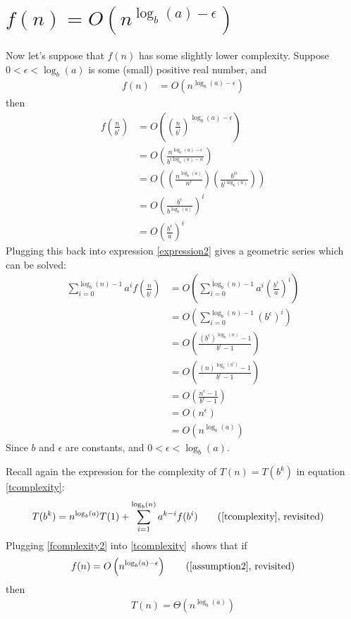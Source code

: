 \documentclass{article}
\begin{document}
\section{$f(n) = O\left(n^{\log_b(a)-\epsilon}\right)$}
\normalsize
Now let's suppose that $f(n)$ has some slightly lower complexity.
Suppose $0< \epsilon < \log_b(a)$ is some (small) positive real number, and
\LARGE
\begin{align}
  f(n) &= O\left(n^{\log_b(a)-\epsilon}\right)\label{assumption2}
\end{align}
\normalsize
then
\LARGE
\begin{align}
f\left(\frac{n}{b^i}\right) &=
O\left(
\left(
\frac{n}{b^i}
\right)^{\log_b(a) - \epsilon}
\right)
\\
&=
O\left(
\frac{n^{\log_b(a)-\epsilon}}{b^{i\log_b(a)-i\epsilon}}
\right)
\\
&=
O\left(
\left(
\frac{n^{\log_b(a)}} {n^{\epsilon}}
\right)
\left(
\frac{b^{i\epsilon}} {b^{i\log_b(a)}} 
\right)
\right)
\\
&=
O\left(
\frac{b^{\epsilon}} {b^{\log_b(a)}} 
\right)^i
\\
&=
O\left(
\frac{b^{\epsilon}} {a} 
\right)^i
\end{align}
\normalsize
Plugging this back into expression \ref{expression2} gives a geometric
series which can be solved:
\LARGE
\begin{align}
  \sum_{i=0}^{\log_b(n)-1} a^{i}f\left(\frac{n}{b^{i}}\right)
  &=
  O\left(
  \sum_{i=0}^{\log_b(n)-1} a^{i}
  \left(\frac{b^\epsilon}{a}\right)^i
  \right)
  \\
  &=
  O\left(
  \sum_{i=0}^{\log_b(n)-1} (b^\epsilon)^{i}
  \right)
  \\
  &=
  O  \left(
  \frac{(b^\epsilon)^{\log_b(n)} - 1}
       {b^\epsilon - 1}
       \right)
       \\
  &=
  O  \left(
  \frac{(n)^{\log_b(b^\epsilon)} - 1}
       {b^\epsilon - 1}
       \right)
       \\
  &=
  O  \left(
  \frac{n^\epsilon - 1}
       {b^\epsilon - 1}
       \right)\\
  &=
       O\left(n^\epsilon\right)\\
       &=
  O\left(n^{\log_b(a)}\right)       \label{fcomplexity2}
\end{align}
\normalsize
Since $b$ and $\epsilon$ are constants, and $0<\epsilon < \log_b(a)$.

Recall again the expression for the complexity of $T(n)=T(b^k)$ in equation
\ref{tcomplexity}: 
\LARGE
\begin{align*}
T(b^k)
&=
n^{\log_b(a)}T(1) + \sum_{i=1}^{\log_b(n)} a^{k-i}f(b^{i})
\tag{\ref{tcomplexity}, revisited}
\end{align*}
\normalsize
Plugging \ref{fcomplexity2} into \ref{tcomplexity}\ shows that if
\LARGE
\begin{align*}
f(n) = O\left(n^{\log_b(a)-\epsilon}\right)\tag{\ref{assumption2}, revisited}
  \end{align*}
\normalsize
then
\LARGE
\begin{align}
  T(n) = \Theta\left(n^{\log_b(a)}\right)
  \end{align}
\end{document}

